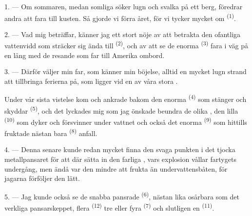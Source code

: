 %

\VUsaut{4.0mm}
\VUsaut{3.0mm}
\VUsaut{3.0mm}

1. --- Om sommaren, medan somliga söker lugn och svalka på ett berg, föredrar andra att fara
till kusten. Så gjorde vi förra året, för vi tycker mycket om
 \textsuperscript{(1)}.

2. --- Vad mig beträffar, känner jag ett stort nöje av att betrakta den ofantliga vattenvidd
som sträcker sig ända till  \textsuperscript{(2)}, och av att se de enorma
 \textsuperscript{(3)} fara i väg på en lång  med de
resande som far till Amerika ombord.

3. --- Därför väljer min far, som känner min böjelse, alltid en mycket lugn strand att
tillbringa ferierna på, som ligger vid en av våra stora
.

Under vår sista vistelse kom  och ankrade bakom den enorma
 \textsuperscript{(4)} som stänger och skyddar
 \textsuperscript{(5)}, och det lyckades mig som jag önskade
beundra de olika , den lilla 
\textsuperscript{(10)} som dyker och försvinner under vattnet och också det enorma
 \textsuperscript{(9)} som hittills fruktade nästan bara
 \textsuperscript{(8)} anfall.

\VUsaut{3.0mm}
\VUsaut{3.0mm}

4. --- Denna senare kunde redan mycket  finna den svaga punkten i det tjocka
metallpansaret för att där sätta in den farliga , vars explosion vållar
fartygets undergång, men ändå var den mindre att frukta än undervattensbåten, för jagarna
förföljer den lätt.

5. --- Jag kunde också se de snabba pansrade  \textsuperscript{(6)}, nästan
lika osårbara som det verkliga pansarskeppet, flera
 \textsuperscript{(12)} tre eller fyra
 \textsuperscript{(7)} och slutligen en 
\textsuperscript{(11)}.

